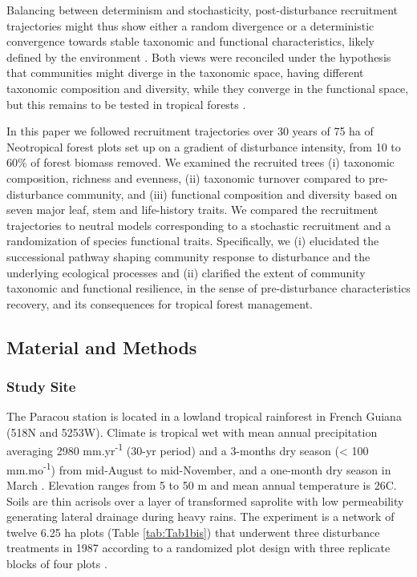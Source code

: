 \documentclass[
  11pt,
  french,
  A4paper,
  extrafontsizes,onecolumn,openright
  ]{memoir}
\begin{document}
Balancing between determinism and stochasticity, post-disturbance
recruitment trajectories might thus show either a random divergence or a
deterministic convergence towards stable taxonomic and functional
characteristics, likely defined by the environment
\autocites{Clements1916}{Diamond1975}. Both views were reconciled under
the hypothesis that communities might diverge in the taxonomic space,
having different taxonomic composition and diversity, while they
converge in the functional space, but this remains to be tested in
tropical forests \autocites{Fukami2005}{Li2018}.

In this paper we followed recruitment trajectories over 30 years of 75
ha of Neotropical forest plots set up on a gradient of disturbance
intensity, from 10 to 60\% of forest biomass removed. We examined the
recruited trees (i) taxonomic composition, richness and evenness, (ii)
taxonomic turnover compared to pre-disturbance community, and (iii)
functional composition and diversity based on seven major leaf, stem and
life-history traits. We compared the recruitment trajectories to neutral
models corresponding to a stochastic recruitment and a randomization of
species functional traits. Specifically, we (i) elucidated the
successional pathway shaping community response to disturbance and the
underlying ecological processes and (ii) clarified the extent of
community taxonomic and functional resilience, in the sense of
pre-disturbance characteristics recovery, and its consequences for
tropical forest management.

\subsection{Material and Methods}\label{material-and-methods-1}

\subsubsection{Study Site}\label{study-site-1}

The Paracou station is located in a lowland tropical rainforest in
French Guiana (518\textdegree N and 5253\textdegree W). Climate is
tropical wet with mean annual precipitation averaging 2980
mm.yr\textsuperscript{-1} (30-yr period) and a 3-months dry season
(\textless{} 100 mm.mo\textsuperscript{-1}) from mid-August to
mid-November, and a one-month dry season in March \autocite{Wagner2011}.
Elevation ranges from 5 to 50 m and mean annual temperature is
26\textdegree C. Soils are thin acrisols over a layer of transformed
saprolite with low permeability generating lateral drainage during heavy
rains. The experiment is a network of twelve 6.25 ha plots (Table
\ref{tab:Tab1bis}) that underwent three disturbance treatments in 1987
according to a randomized plot design with three replicate blocks of
four plots \autocite{Herault2018}.
\end{document}
